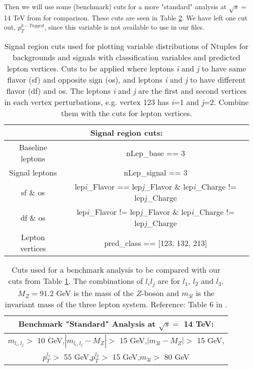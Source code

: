 \documentclass[a4paper, american, 12pt]{report}
\begin{document}
	Then we will use some (benchmark) cuts for a more "standard" analysis at $\sqrt{s} =$ 14 TeV from \citet{inverseseesaw} for comparison. These cuts are seen in Table \ref{tab:Cuts_Benchmark}. We have left one cut out, $p_T^{b-Tagged}$, since this variable is not available to use in our files.
	\begin{table}[h!]
		\hspace{-0.5cm}
		\begin{tabular}{|c|c|}
			\hline
			\multicolumn{2}{|c|}{\textbf{Signal region cuts:}}\\
			\hline \rule{0pt}{13pt}
			Baseline leptons & nLep\_base == 3 \\
			Signal leptons & nLep\_signal == 3 \\
			\acrshort{sf} \& \acrshort{os} & lep\textit{i}\_Flavor == lep\textit{j}\_Flavor \& lep\textit{i}\_Charge != lep\textit{j}\_Charge\\
			\acrshort{df} \& \acrshort{os} & lep\textit{i}\_Flavor != lep\textit{j}\_Flavor \& lep\textit{i}\_Charge != lep\textit{j}\_Charge\\
			Lepton vertices & pred\_class == [123, 132, 213]\\
			\hline
		\end{tabular}
		\caption[Signal region cuts for Ntuples.]{Signal region cuts used for plotting variable distributions of Ntuples for backgrounds and signals with classification variables and predicted lepton vertices. Cuts to be applied where leptons \textit{i} and \textit{j} to have same flavor (\acrshort{sf}) and opposite sign (\acrshort{os}), and leptons \textit{i} and \textit{j} to have different flavor (\acrshort{df}) and \acrshort{os}. The leptons \textit{i} and \textit{j} are the first and second vertices in each vertex perturbations, e.g. vertex 123 has \textit{i}=1 and \textit{j}=2. Combine them with the cuts for lepton vertices.}
		\label{tab:Cuts_class}
	\end{table}
	\begin{table}[ht!]
		\centering
		\begin{tabular}{|c|}
			\hline \rule{0pt}{13pt}
			\textbf{Benchmark "Standard" Analysis at $\sqrt{s}=$ 14 TeV:}\\
			\hline \rule{0pt}{13pt}
			$m_{l_i,l_j}>$ 10 GeV,\quad $|m_{l_i,l_j}-M_Z|>$ 15 GeV,\quad $|m_{3l}-M_Z|>$ 15 GeV,\\
			$p_T^{l_1}>$ 55 GeV,\quad $p_T^{l_2}>$ 15 GeV,\quad $m_{3l}>$ 80 GeV\\
			\hline
		\end{tabular}
		\caption[Benchmark analysis cuts.]{Cuts used for a benchmark analysis to be compared with our cuts from Table \ref{tab:Cuts_class}. The combinations of $l_il_j$ are for $l_1$, $l_2$ and $l_3$. $M_Z=91.2$ GeV is the mass of the $Z$-boson and $m_{3l}$ is the invariant mass of the three lepton system. Reference: Table 6 in \citet{inverseseesaw}.}
		\label{tab:Cuts_Benchmark}
	\end{table}
			
\end{document}

